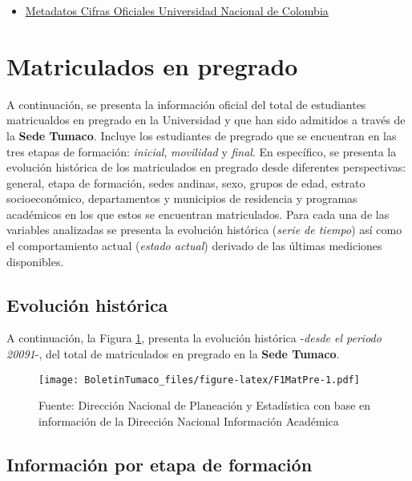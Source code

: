 \documentclass[
]{book}
\providecommand{\tightlist}{%
  \setlength{\itemsep}{0pt}\setlength{\parskip}{0pt}}
\begin{document}
\begin{itemize}
\tightlist
\item
  \href{http://estadisticas.unal.edu.co/menu-principal/cifras-generales/metadatos/cifras-generales/}{Metadatos Cifras Oficiales Universidad Nacional de Colombia}
\end{itemize}

\hypertarget{MatPre}{%
\section{Matriculados en pregrado}\label{MatPre}}

A continuación, se presenta la información oficial del total de estudiantes matricualdos en pregrado en la Universidad y que han sido admitidos a través de la \textbf{Sede Tumaco}. Incluye los estudiantes de pregrado que se encuentran en las tres etapas de formación: \emph{inicial}, \emph{movilidad} y \emph{final}. En específico, se presenta la evolución histórica de los matriculados en pregrado desde diferentes perspectivas: general, etapa de formación, sedes andinas, sexo, grupos de edad, estrato socioeconómico, departamentos y municipios de residencia y programas académicos en los que estos se encuentran matriculados. Para cada una de las variables analizadas se presenta la evolución histórica (\emph{serie de tiempo}) así como el comportamiento actual (\emph{estado actual}) derivado de las últimas mediciones disponibles.

\hypertarget{evoluciuxf3n-histuxf3rica-2}{%
\subsection{Evolución histórica}\label{evoluciuxf3n-histuxf3rica-2}}

A continuación, la Figura \ref{fig:F1MatPre}, presenta la evolución histórica -\emph{desde el periodo 20091}-, del total de matriculados en pregrado en la \textbf{Sede Tumaco}.

\begin{figure}
\centering
\texttt{[image: BoletinTumaco\_files/figure-latex/F1MatPre-1.pdf]}
\caption{\label{fig:F1MatPre}Fuente: Dirección Nacional de Planeación y Estadística con base en información de la Dirección Nacional Información Académica}
\end{figure}

\hypertarget{informaciuxf3n-por-etapa-de-formaciuxf3n}{%
\subsection{Información por etapa de formación}\label{informaciuxf3n-por-etapa-de-formaciuxf3n}}
\end{document}
